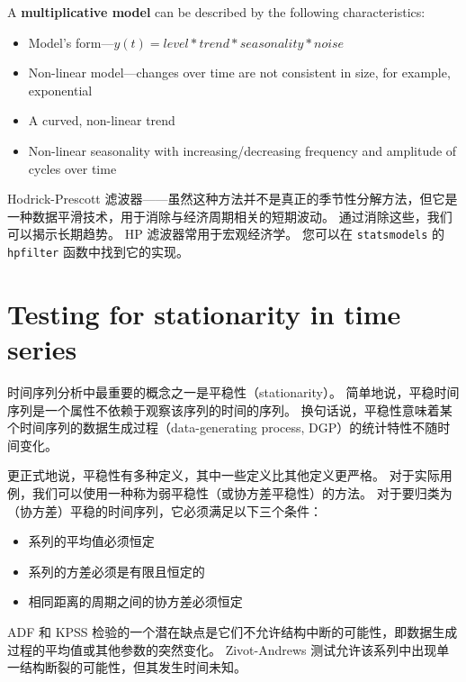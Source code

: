 A \textbf{multiplicative model} can be described by the following characteristics:
\begin{itemize}
    \item Model's form—$y(t) = level * trend * seasonality * noise$
    \item Non-linear model—changes over time are not consistent in size, for example, exponential
    \item A curved, non-linear trend
    \item Non-linear seasonality with increasing/decreasing frequency and amplitude of cycles over time
\end{itemize}

Hodrick-Prescott 滤波器——虽然这种方法并不是真正的季节性分解方法，但它是一种数据平滑技术，用于消除与经济周期相关的短期波动。 通过消除这些，我们可以揭示长期趋势。 HP 滤波器常用于宏观经济学。 您可以在 \verb|statsmodels| 的 \verb|hpfilter| 函数中找到它的实现。

\section{Testing for stationarity in time series}
时间序列分析中最重要的概念之一是平稳性（stationarity）。 简单地说，平稳时间序列是一个属性不依赖于观察该序列的时间的序列。 换句话说，平稳性意味着某个时间序列的数据生成过程（data-generating process, DGP）的统计特性不随时间变化。

更正式地说，平稳性有多种定义，其中一些定义比其他定义更严格。 对于实际用例，我们可以使用一种称为弱平稳性（或协方差平稳性）的方法。 对于要归类为（协方差）平稳的时间序列，它必须满足以下三个条件：
\begin{itemize}
    \item 系列的平均值必须恒定
    \item 系列的方差必须是有限且恒定的
    \item 相同距离的周期之间的协方差必须恒定
\end{itemize}

ADF 和 KPSS 检验的一个潜在缺点是它们不允许结构中断的可能性，即数据生成过程的平均值或其他参数的突然变化。 Zivot-Andrews 测试允许该系列中出现单一结构断裂的可能性，但其发生时间未知。